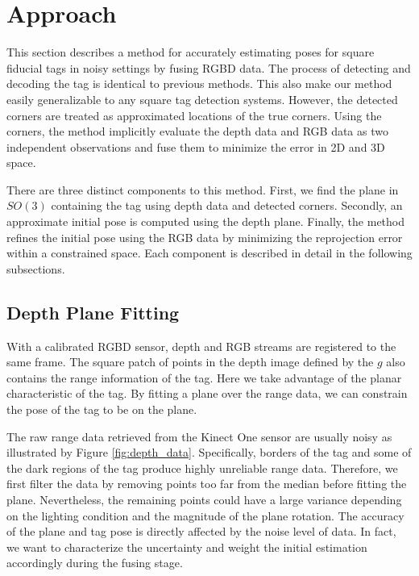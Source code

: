 \section{Approach}
\label{sec:approach}
This section describes a method for accurately estimating poses for square fiducial tags in noisy settings by fusing RGBD data. The process of detecting and decoding the tag is identical to previous methods. This also make our method easily generalizable to any square tag detection systems. However, the detected corners are treated as approximated locations of the true corners. Using the corners, the method implicitly evaluate the depth data and RGB data as two independent observations and fuse them to minimize the error in 2D and 3D space.

There are three distinct components to this method. First, we find the plane in $SO(3)$ containing the tag using depth data and detected corners. Secondly, an approximate initial pose is computed using the depth plane. Finally, the method refines the initial pose using the RGB data by minimizing the reprojection error within a constrained space. Each component is described in detail in the following subsections. 

\subsection{Depth Plane Fitting}
With a calibrated RGBD sensor, depth and RGB streams are registered to the same frame. The square patch of points in the depth image defined by the $g$ also contains the range information of the tag. Here we take advantage of the planar characteristic of the tag. By fitting a plane over the range data, we can constrain the pose of the tag to be on the plane.

The raw range data retrieved from the Kinect One sensor are usually noisy as illustrated by Figure \ref{fig:depth_data}. Specifically, borders of the tag and some of the dark regions of the tag produce highly unreliable range data. Therefore, we first filter the data by removing points too far from the median before fitting the plane. Nevertheless, the remaining points could have a large variance depending on the lighting condition and the magnitude of the plane rotation. The accuracy of the plane and tag pose is directly affected by the noise level of data. In fact, we want to characterize the uncertainty and weight the initial estimation accordingly during the fusing stage.

